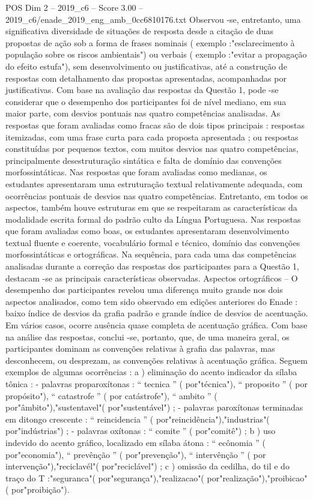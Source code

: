\begin{textsample}{POS Dim 2 – 2019\_c6 – Score 3.00 – 2019\_c6/enade\_2019\_eng\_amb\_0cc6810176.txt}
Observou -se, entretanto, uma significativa diversidade de situações de resposta desde a citação de duas propostas de ação sob a forma de frases nominais ( exemplo :"esclarecimento à população sobre os riscos ambientais") ou verbais ( exemplo :"evitar a propagação do efeito estufa"), sem desenvolvimento ou justificativas, até a construção de respostas com detalhamento das propostas apresentadas, acompanhadas por justificativas.
Com base na avaliação das respostas da Questão 1, pode -se considerar que o desempenho dos participantes foi de nível mediano, em sua maior parte, com desvios pontuais nas quatro competências analisadas.
As respostas que foram avaliadas como fracas são de dois tipos principais : respostas itemizadas, com uma frase curta para cada proposta apresentada ; ou respostas constituídas por pequenos textos, com muitos desvios nas quatro competências, principalmente desestruturação sintática e falta de domínio das convenções morfossintáticas.
Nas respostas que foram avaliadas como medianas, os estudantes apresentaram uma estruturação textual relativamente adequada, com ocorrências pontuais de desvios nas quatro competências.
Entretanto, em todos os aspectos, também houve estruturas em que se respeitaram as características da modalidade escrita formal do padrão culto da Língua Portuguesa.
Nas respostas que foram avaliadas como boas, os estudantes apresentaram desenvolvimento textual fluente e coerente, vocabulário formal e técnico, domínio das convenções morfossintáticas e ortográficas.
Na sequência, para cada uma das competências analisadas durante a correção das respostas dos participantes para a Questão 1, destacam -se as principais características observadas.
Aspectos ortográficos – O desempenho dos participantes revelou uma diferença muito grande nos dois aspectos analisados, como tem sido observado em edições anteriores do Enade : baixo índice de desvios da grafia padrão e grande índice de desvios de acentuação.
Em vários casos, ocorre ausência quase completa de acentuação gráfica.
Com base na análise das respostas, conclui -se, portanto, que, de uma maneira geral, os participantes dominam as convenções relativas à grafia das palavras, mas desconhecem, ou desprezam, as convenções relativas à acentuação gráfica.
Seguem exemplos de algumas ocorrências : a ) eliminação do acento indicador da sílaba tônica : - palavras proparoxítonas : “ tecnica ” ( por"técnica"), “ proposito ” ( por propósito"), “ catastrofe ” ( por catástrofe"), “ ambito ” ( por"âmbito"),"sustentavel"( por"sustentável") ; - palavras paroxítonas terminadas em ditongo crescente : “ reincidencia ” ( por"reincidência"),"industrias"( por"indústrias") ; - palavras oxítonas : “ comite ” ( por"comitê") ; b ) uso indevido do acento gráfico, localizado em sílaba átona : “ ecônomia ” ( por"economia"), “ prevênção ” ( por"prevenção"), “ intervênção ” ( por intervenção"),"reciclavél"( por"reciclável") ; c ) omissão da cedilha, do til e do traço do T :"seguranca"( por"segurança"),"realizacao"( por"realização"),"proibicao"( por"proibição").

\end{textsample}
